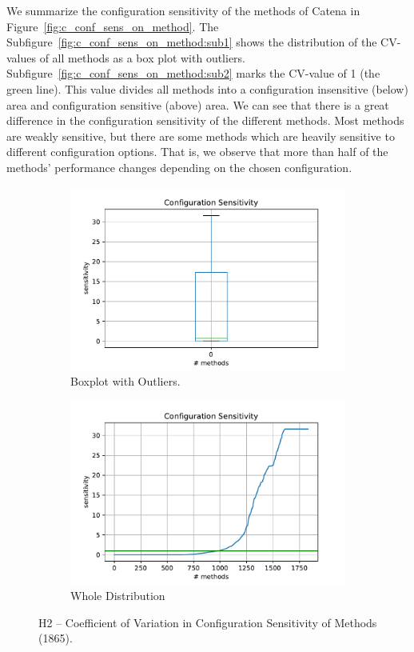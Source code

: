 We summarize the configuration sensitivity of the methods of Catena in Figure~\ref{fig:c_conf_sens_on_method}. The Subfigure~\ref{fig:c_conf_sens_on_method:sub1} shows the distribution of the \ac{CV}-values of all methods as a box plot with outliers. Subfigure~\ref{fig:c_conf_sens_on_method:sub2} marks the \ac{CV}-value of 1 (the green line). This value divides all methods into a configuration insensitive (below) area and configuration sensitive (above) area. We can see that there is a great difference in the configuration sensitivity of the different methods. Most methods are weakly sensitive, but there are some methods which are heavily sensitive to different configuration options. That is, we observe that more than half of the methods' performance changes depending on the chosen configuration. 

\begin{figure}[h]
	\centering
	\begin{subfigure}{.5\textwidth}
	  \centering
	  \includegraphics[width=.99\linewidth]{images/H2_box_conf_sens_cv_with_outl}
	  \caption{Boxplot with Outliers.}
	  \label{fig:h_conf_sens_on_method:sub1}
	\end{subfigure}%
	\begin{subfigure}{.5\textwidth}
	  \centering
	  \includegraphics[width=.99\linewidth]{images/H2_plt_conf_sens_cv_with_outl}
	  \caption{Whole Distribution}
	  \label{fig:h_conf_sens_on_method:sub2}
	\end{subfigure}
	\caption{H2 -- Coefficient of Variation in Configuration Sensitivity of Methods (1865).}
	\label{fig:h_conf_sens_on_method}
\end{figure}

